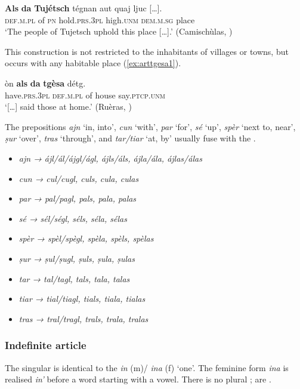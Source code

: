 \ea
\label{ex:artdemonym1}
\gll    \textbf{Als} \textbf{da} \textbf{Tujétsch} tégnan aut quaj ljuc […].\\
 \textsc{def.m.pl} of \textsc{pn} hold.\textsc{prs.3pl} high.\textsc{unm} \textsc{dem.m.sg} place\\
\glt `The people of Tujetsch uphold this place […].' (Camischùlas, \citealt[94]{Büchli1966})
\z

This construction is not restricted to the inhabitants of villages or towns, but occurs with any habitable place (\ref{ex:arttgesa1}).

\ea\label{ex:arttgesa1}
\gll […] òn \textbf{als} \textbf{da} \textbf{tgèsa} détg.\\
{} have.\textsc{prs.3pl} \textsc{def.m.pl} of house say.\textsc{ptcp.unm}\\
\glt `[…] said those at home.' (Ruèras, \citealt[68]{Büchli1966})
\z

The prepositions \textit{ajn} `in, into', \textit{cun} `with', \textit{par} `for', \textit{sé} `up', \textit{spèr} `next to, near', \textit{ṣur} `over', \textit{tras} `through', and \textit{tar/tiar} `at, by' usually fuse with the .

\begin{itemize}
	\item \textit{ajn → ájl/ál/ájgl/ágl, ájls/áls,  ájla/ála, ájlas/álas}
	\item \textit{cun → cul/cugl, culs, cula, culas}
	\item \textit{par → pal/pagl, pals, pala, palas}
	\item \textit{sé → sél/ségl, séls, séla, sélas}
	\item \textit{spèr → spèl/spègl, spèla, spèls, spèlas}
	\item \textit{ṣur → ṣul/ṣugl, ṣuls, ṣula, ṣulas}
	\item \textit{tar → tal/tagl, tals, tala, talas}
	\item \textit{tiar → tial/tiagl, tials, tiala, tialas}
	\item \textit{tras → tral/tragl, trals, trala, tralas}
\end{itemize}


\subsubsection{Indefinite article}\label{sec:3.2.1.2}
The  singular is identical to the  \textit{in} (m)/ \textit{ina} (f) ‘one’. The feminine form \textit{ina} is realised \textit{in'} before a word starting with a vowel. There is no plural ;  are .

